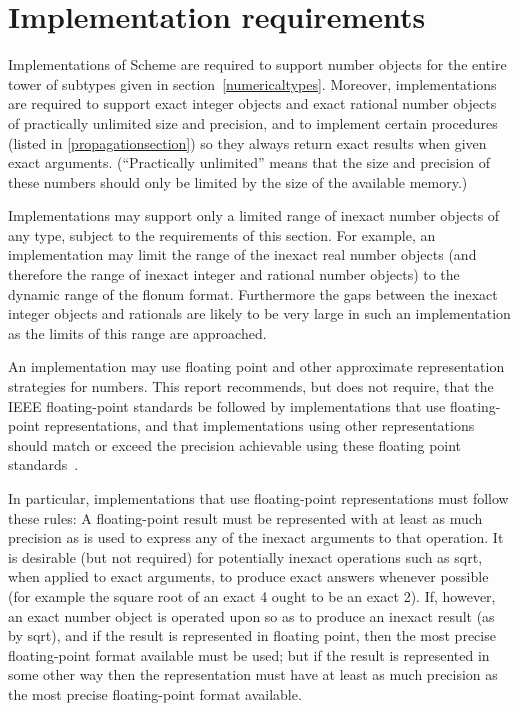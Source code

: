 \section{Implementation requirements}

\label{restrictions}

Implementations of Scheme are required to support number objects for
the entire tower of subtypes given in section~\ref{numericaltypes}.
Moreover, implementations are required to support exact integer 
objects and exact rational number objects of practically unlimited
size and precision, and to implement certain procedures (listed in
\ref{propagationsection}) so they always return exact results when
given exact arguments.  (``Practically unlimited'' means that the size
and precision of these numbers should only be limited by the size of
the available memory.)

Implementations may support only a limited range of inexact number
objects of any type, subject to the requirements of this section.  For
example, an implementation may limit the range of the inexact real
number objects (and therefore the range of inexact integer and
rational number objects) to the dynamic range of the flonum format.
Furthermore the gaps between the inexact integer objects and
rationals are likely to be very large in such an implementation as the
limits of this range are approached.

An implementation may use floating point and other approximate 
representation strategies for  numbers.
This report recommends, but does not require, that the IEEE 
floating-point standards be followed by implementations that use
floating-point representations, and that implementations using
other representations should match or exceed the precision achievable
using these floating point standards~\cite{IEEE}.

In particular, implementations that use floating-point representations
must follow these rules: A floating-point result must be represented
with at least as much precision as is used to express any of the
inexact arguments to that operation.  It is desirable (but not
required) for potentially inexact operations such as {\cf sqrt}, when
applied to exact arguments, to produce exact answers whenever possible
(for example the square root of an exact 4 ought to be an exact 2).
If, however, an exact number object is operated upon so as to produce an
inexact result (as by {\cf sqrt}), and if the result is represented in
floating point, then the most precise floating-point format available
must be used; but if the result is represented in some other way then
the representation must have at least as much precision as the most
precise floating-point format available.

